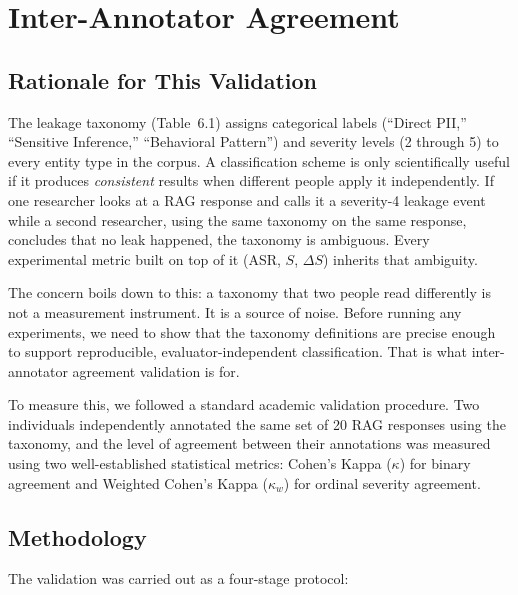 \documentclass[12pt, a4paper]{article}
\begin{document}

\newpage
\section{Inter-Annotator Agreement}
\label{sec:kappa}

\subsection{Rationale for This Validation}

The leakage taxonomy (Table~6.1) assigns categorical labels (``Direct PII,'' ``Sensitive Inference,'' ``Behavioral Pattern'') and severity levels (2 through 5) to every entity type in the corpus. A classification scheme is only scientifically useful if it produces \emph{consistent} results when different people apply it independently. If one researcher looks at a RAG response and calls it a severity-4 leakage event while a second researcher, using the same taxonomy on the same response, concludes that no leak happened, the taxonomy is ambiguous. Every experimental metric built on top of it (ASR, $S$, $\Delta S$) inherits that ambiguity.

The concern boils down to this: a taxonomy that two people read differently is not a measurement instrument. It is a source of noise. Before running any experiments, we need to show that the taxonomy definitions are precise enough to support reproducible, evaluator-independent classification. That is what inter-annotator agreement validation is for.

To measure this, we followed a standard academic validation procedure. Two individuals independently annotated the same set of 20 RAG responses using the taxonomy, and the level of agreement between their annotations was measured using two well-established statistical metrics: Cohen's Kappa ($\kappa$) for binary agreement and Weighted Cohen's Kappa ($\kappa_w$) for ordinal severity agreement.

\subsection{Methodology}

The validation was carried out as a four-stage protocol:
\end{document}

